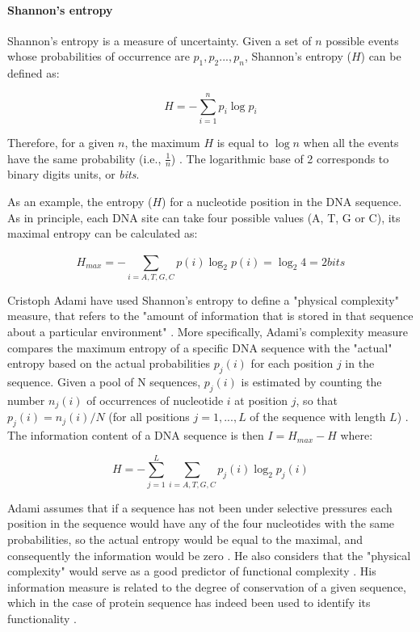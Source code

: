 \paragraph{Shannon's entropy}

Shannon's entropy is a measure of uncertainty. Given a set of $n$ possible events whose probabilities of occurrence are $p_{1}, p_{2}...,p_{n}$, Shannon's entropy ($H$) can be defined as:

$$H = -\sum_{i=1}^{n} p_{i} \log p_{i}$$

Therefore, for a given $n$, the maximum $H$ is equal to $\log n$ when all the events have the same probability (i.e., $\frac{1}{n}$) \citep{Shannon1948}. The logarithmic base of 2 corresponds to binary digits units, or \textit{bits}.

As an example, the entropy ($H$) for a nucleotide position in the DNA sequence. As in principle, each DNA site can take four possible values (A, T, G or C), its maximal entropy can be calculated as:

$$H_{max} = -\sum_{i=A,T,G,C}^{} p(i) \log_{2} p(i) = \log_{2} 4 = 2 bits $$

Cristoph Adami have used Shannon's entropy to define a "physical complexity" measure, that refers to the "amount of information that is stored in that sequence about a particular environment" \citep{Adami2002}.
%
More specifically, Adami's complexity measure compares the maximum entropy of a specific DNA sequence with the "actual" entropy based on the actual probabilities $p_{j}(i)$ for each position $j$ in the sequence. Given a pool of N sequences, $p_{j}(i)$ is estimated by counting the number $n_{j}(i)$  of occurrences of nucleotide $i$ at position $j$, so that $p_{j}(i)=n_{j}(i)/N$ (for all positions $j =1,...,L$ of the sequence with length $L$) \citep{Adami2000}. 
The information content of a DNA sequence is then $I = H_{max} - H $  where:

$$H = -\sum_{j=1}^{L} \sum_{i=A,T,G,C}^{} p_{j}(i) \log_{2} p_{j}(i) $$

Adami assumes that if a sequence has not been under selective pressures each position in the sequence would have any of the four nucleotides with the same probabilities, so the actual entropy would be equal to the maximal, and consequently the information would be zero \citep{Adami2002}. 
He also considers that the "physical complexity" would serve as a good predictor of functional complexity \citep{Adami2004}. 
His information measure is related to the degree of conservation of a given sequence, which in the case of protein sequence has indeed been used to identify its functionality \citep{Casari1995,Kellis2003,Hannenhalli2000}.


